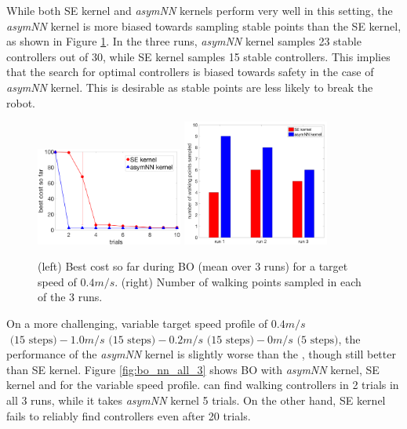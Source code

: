 While both SE kernel and \textit{asymNN} kernels perform very well in this setting, the \textit{asymNN} kernel is more biased towards sampling stable points than the SE kernel, as shown in Figure \ref{fig:bo_runs_plot_atrias_hw}. In the three runs, \textit{asymNN} kernel samples 23 stable controllers out of 30, while SE kernel samples 15 stable controllers. This implies that the search for optimal controllers is biased towards safety in the case of \textit{asymNN} kernel. This is desirable as stable points are less likely to break the robot.

\begin{figure}[t]
\centering
\includegraphics[width=0.43\textwidth]{img/hdw_runs.png}
\hspace{0.15cm}
\includegraphics[width=0.43\textwidth]{img/walking_pts_sampled}
\caption{\small{(left) Best cost so far during BO (mean over 3 runs) for a target speed of $0.4m/s$. (right) Number of walking points sampled in each of the 3 runs.}}
\label{fig:bo_runs_plot_atrias_hw}
\end{figure}

On a more challenging, variable target speed profile of $0.4 m/s$ $\text{ (15 steps)} - 1.0 m/s \text{ (15 steps)} - 0.2 m/s \text{ (15 steps)} - 0 m/s \text{ (5 steps)}$, the performance of the \textit{asymNN} kernel is slightly worse than the \dogkernel, though still better than SE kernel. Figure \ref{fig:bo_nn_all_3} shows BO with  \textit{asymNN} kernel, SE kernel and \dogkernel for the variable speed profile. \dogkernel can find walking controllers in 2 trials in all 3 runs, while it takes \textit{asymNN} kernel 5 trials. On the other hand, SE kernel fails to reliably find controllers even after 20 trials.

